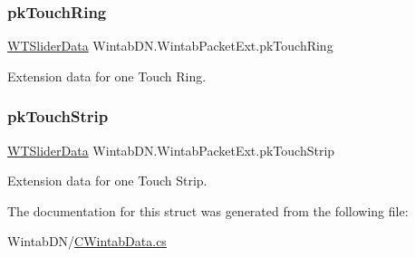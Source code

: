 \mbox{\label{struct_wintab_d_n_1_1_wintab_packet_ext_aef671e3cbf8f82fc4a2d83db6ae33bb2}} 
\subsubsection{\texorpdfstring{pk\+Touch\+Ring}{pkTouchRing}}
{\footnotesize\ttfamily \mbox{\hyperlink{struct_wintab_d_n_1_1_w_t_slider_data}{W\+T\+Slider\+Data}} Wintab\+D\+N.\+Wintab\+Packet\+Ext.\+pk\+Touch\+Ring}



Extension data for one Touch Ring. 

\mbox{\label{struct_wintab_d_n_1_1_wintab_packet_ext_a563f04600ae40cbcef2a146dd88020b6}} 
\subsubsection{\texorpdfstring{pk\+Touch\+Strip}{pkTouchStrip}}
{\footnotesize\ttfamily \mbox{\hyperlink{struct_wintab_d_n_1_1_w_t_slider_data}{W\+T\+Slider\+Data}} Wintab\+D\+N.\+Wintab\+Packet\+Ext.\+pk\+Touch\+Strip}



Extension data for one Touch Strip. 



The documentation for this struct was generated from the following file\+:\begin{DoxyCompactItemize}
\item 
Wintab\+D\+N/\mbox{\hyperlink{_c_wintab_data_8cs}{C\+Wintab\+Data.\+cs}}\end{DoxyCompactItemize}

